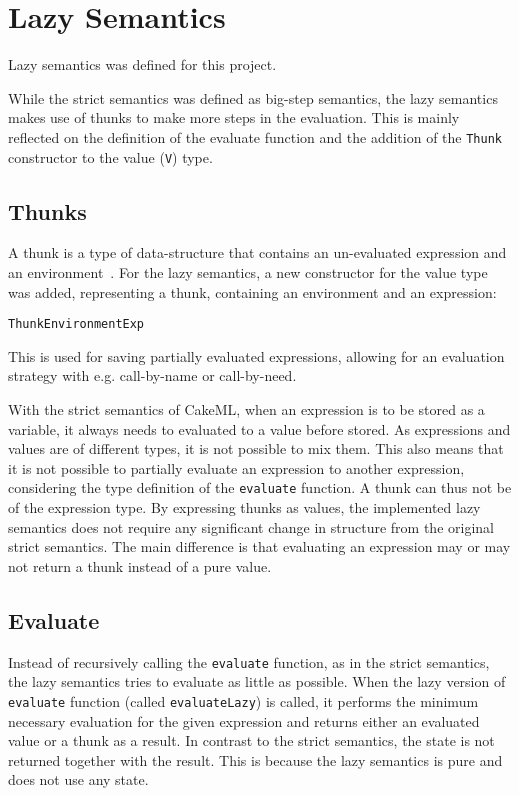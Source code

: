 \chapter{Lazy Semantics}
\label{LazySem}
Lazy semantics was defined for this project.

While the strict semantics was defined as big-step semantics, the lazy semantics
makes use of thunks to make more steps in the evaluation.
This is mainly reflected on the definition of the evaluate function
and the addition of the \texttt{Thunk} constructor to the value (\texttt{V})
type.

\section{Thunks}
A thunk is a type of data-structure that contains an un-evaluated expression
and an environment~\cite{Takano:2015:TRL:2695664.2695693}.
For the lazy semantics, a new constructor for the value type was added,
representing a thunk, containing an environment and an expression:
\begin{alltt}
Thunk Environment Exp
\end{alltt}
This is used for saving
partially evaluated expressions, allowing for an evaluation strategy with e.g.
call-by-name or call-by-need.

With the strict semantics of CakeML, when an expression is to be stored as a
variable, it always needs to evaluated to a value before stored.
As expressions and values are of different types, it is not possible to mix
them. This also means that it is not possible to partially evaluate an
expression to another expression, considering the type definition of the
\texttt{evaluate} function. A thunk can thus not be of the expression type.
By expressing thunks as values, the implemented lazy semantics does not require
any significant change in structure from the original strict semantics. The main
difference is that evaluating an expression may or may not return a thunk
instead of a pure value.

\section{Evaluate}
\label{Eval}
Instead of recursively calling the \texttt{evaluate} function, as
in the strict semantics, the lazy semantics tries to evaluate as little as possible.
When the lazy version of \texttt{evaluate} function (called
\texttt{evaluateLazy}) is called, it performs the minimum necessary evaluation
for the given expression and returns either an evaluated value or a thunk as a result.
In contrast to the strict semantics, the state is not returned together with the
result. This is because the lazy semantics is pure and does not use any state.


